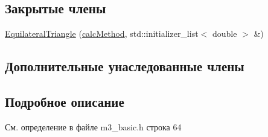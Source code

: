 \subsection*{Закрытые члены}
\begin{DoxyCompactItemize}
\item 
\hyperlink{class_equilateral_triangle_a62872b42bd79252e40d9f4acf1b347bf}{Equilateral\-Triangle} (\hyperlink{class_equilateral_triangle_a9ddc7a249c2c1cc8f4c5fabc0638f207}{calc\-Method}, std\-::initializer\-\_\-list$<$ double $>$ \&)
\end{DoxyCompactItemize}
\subsection*{Дополнительные унаследованные члены}


\subsection{Подробное описание}


См. определение в файле m3\-\_\-basic.\-h строка 64



